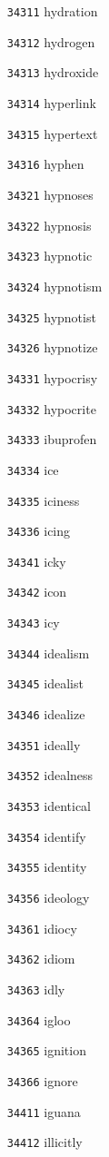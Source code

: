 \documentclass[twoside,11pt]{article}
\begin{document}
\begin{multicols}{5}
\begin{enumerate}
\item[\texttt{34311}] hydration
\item[\texttt{34312}] hydrogen
\item[\texttt{34313}] hydroxide
\item[\texttt{34314}] hyperlink
\item[\texttt{34315}] hypertext
\item[\texttt{34316}] hyphen
\item[\texttt{34321}] hypnoses
\item[\texttt{34322}] hypnosis
\item[\texttt{34323}] hypnotic
\item[\texttt{34324}] hypnotism
\item[\texttt{34325}] hypnotist
\item[\texttt{34326}] hypnotize
\item[\texttt{34331}] hypocrisy
\item[\texttt{34332}] hypocrite
\item[\texttt{34333}] ibuprofen
\item[\texttt{34334}] ice
\item[\texttt{34335}] iciness
\item[\texttt{34336}] icing
\item[\texttt{34341}] icky
\item[\texttt{34342}] icon
\item[\texttt{34343}] icy
\item[\texttt{34344}] idealism
\item[\texttt{34345}] idealist
\item[\texttt{34346}] idealize
\item[\texttt{34351}] ideally
\item[\texttt{34352}] idealness
\item[\texttt{34353}] identical
\item[\texttt{34354}] identify
\item[\texttt{34355}] identity
\item[\texttt{34356}] ideology
\item[\texttt{34361}] idiocy
\item[\texttt{34362}] idiom
\item[\texttt{34363}] idly
\item[\texttt{34364}] igloo
\item[\texttt{34365}] ignition
\item[\texttt{34366}] ignore
\item[\texttt{34411}] iguana
\item[\texttt{34412}] illicitly

\end{enumerate}
\end{multicols}
\end{document}
